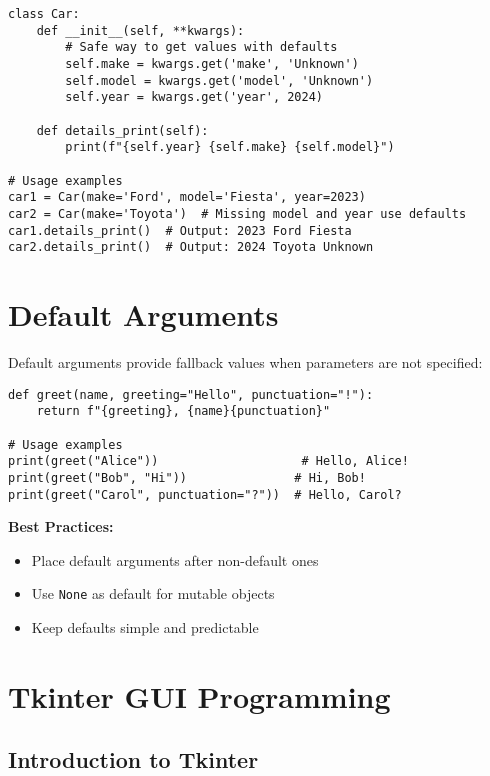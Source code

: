 \documentclass[12pt,a4paper]{article}
\begin{document}
\begin{tcolorbox}[colback=orange!5!white,colframe=orange!75!black,title=Class with **kwargs]
\begin{lstlisting}
class Car:
    def __init__(self, **kwargs):
        # Safe way to get values with defaults
        self.make = kwargs.get('make', 'Unknown')
        self.model = kwargs.get('model', 'Unknown')
        self.year = kwargs.get('year', 2024)
    
    def details_print(self):
        print(f"{self.year} {self.make} {self.model}")

# Usage examples
car1 = Car(make='Ford', model='Fiesta', year=2023)
car2 = Car(make='Toyota')  # Missing model and year use defaults
car1.details_print()  # Output: 2023 Ford Fiesta
car2.details_print()  # Output: 2024 Toyota Unknown
\end{lstlisting}
\end{tcolorbox}

\section{Default Arguments}

Default arguments provide fallback values when parameters are not specified:

\begin{lstlisting}
def greet(name, greeting="Hello", punctuation="!"):
    return f"{greeting}, {name}{punctuation}"

# Usage examples
print(greet("Alice"))                    # Hello, Alice!
print(greet("Bob", "Hi"))               # Hi, Bob!
print(greet("Carol", punctuation="?"))  # Hello, Carol?
\end{lstlisting}

\textbf{Best Practices:}
\begin{itemize}
    \item Place default arguments after non-default ones
    \item Use \texttt{None} as default for mutable objects
    \item Keep defaults simple and predictable
\end{itemize}

\section{Tkinter GUI Programming}

\subsection{Introduction to Tkinter}
\end{document}
